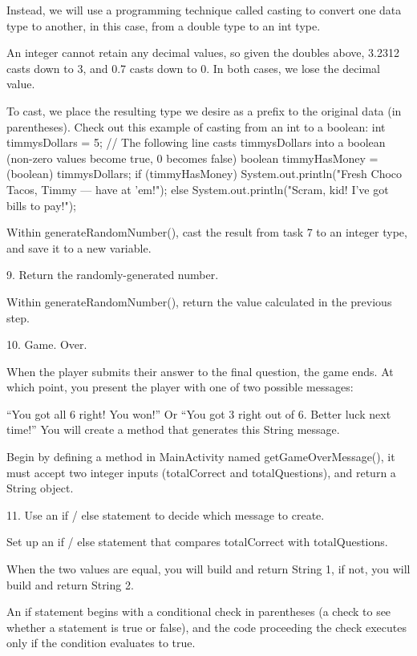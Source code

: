     Instead, we will use a programming technique called casting to convert one data type to another, in this case, from a double type to an int type.

    An integer cannot retain any decimal values, so given the doubles above, 3.2312 casts down to 3, and 0.7 casts down to 0. In both cases, we lose the decimal value.

    To cast, we place the resulting type we desire as a prefix to the original data (in parentheses). Check out this example of casting from an int to a boolean:
        int timmysDollars = 5;
        // The following line casts timmysDollars into a boolean (non-zero values become true, 0 becomes false)
        boolean timmyHasMoney = (boolean) timmysDollars;
        if (timmyHasMoney) {
            System.out.println("Fresh Choco Tacos, Timmy — have at 'em!");
        } else {
            System.out.println("Scram, kid! I've got bills to pay!");
        }

    Within generateRandomNumber(), cast the result from task 7 to an integer type, and save it to a new variable.

    9.
    Return the randomly-generated number.

    Within generateRandomNumber(), return the value calculated in the previous step.

    10.
    Game. Over.

    When the player submits their answer to the final question, the game ends. At which point, you present the player with one of two possible messages:

    “You got all 6 right! You won!”
    Or “You got 3 right out of 6. Better luck next time!”
    You will create a method that generates this String message.

    Begin by defining a method in MainActivity named getGameOverMessage(), it must accept two integer inputs (totalCorrect and totalQuestions), and return a String object.

    11.
    Use an if / else statement to decide which message to create.

    Set up an if / else statement that compares totalCorrect with totalQuestions.

    When the two values are equal, you will build and return String 1, if not, you will build and return String 2.

    An if statement begins with a conditional check in parentheses (a check to see whether a statement is true or false), and the code proceeding the check executes only if the condition evaluates to true.

